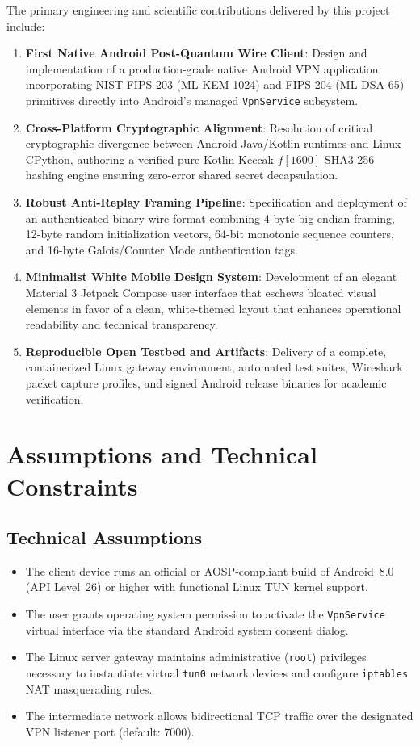 The primary engineering and scientific contributions delivered by this project include:
\begin{enumerate}
    \item \textbf{First Native Android Post-Quantum Wire Client}: Design and implementation of a production-grade native Android VPN application incorporating NIST FIPS 203 (ML-KEM-1024) and FIPS 204 (ML-DSA-65) primitives directly into Android's managed \texttt{VpnService} subsystem.
    \item \textbf{Cross-Platform Cryptographic Alignment}: Resolution of critical cryptographic divergence between Android Java/Kotlin runtimes and Linux CPython, authoring a verified pure-Kotlin Keccak-$f[1600]$ SHA3-256 hashing engine ensuring zero-error shared secret decapsulation.
    \item \textbf{Robust Anti-Replay Framing Pipeline}: Specification and deployment of an authenticated binary wire format combining 4-byte big-endian framing, 12-byte random initialization vectors, 64-bit monotonic sequence counters, and 16-byte Galois/Counter Mode authentication tags.
    \item \textbf{Minimalist White Mobile Design System}: Development of an elegant Material 3 Jetpack Compose user interface that eschews bloated visual elements in favor of a clean, white-themed layout that enhances operational readability and technical transparency.
    \item \textbf{Reproducible Open Testbed and Artifacts}: Delivery of a complete, containerized Linux gateway environment, automated test suites, Wireshark packet capture profiles, and signed Android release binaries for academic verification.
\end{enumerate}

\section{Assumptions and Technical Constraints}
\label{sec:assumptions_constraints}

\subsection{Technical Assumptions}
\begin{itemize}
    \item The client device runs an official or AOSP-compliant build of Android~8.0 (API Level~26) or higher with functional Linux TUN kernel support.
    \item The user grants operating system permission to activate the \texttt{VpnService} virtual interface via the standard Android system consent dialog.
    \item The Linux server gateway maintains administrative (\texttt{root}) privileges necessary to instantiate virtual \texttt{tun0} network devices and configure \texttt{iptables} NAT masquerading rules.
    \item The intermediate network allows bidirectional TCP traffic over the designated VPN listener port (default: 7000).
\end{itemize}

